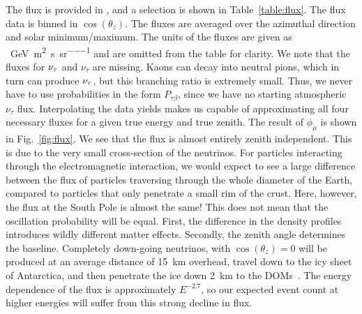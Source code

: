 The flux is provided in \cite{hondaData,hondaArticle}, and a selection is shown in Table~\ref{table:flux}.
The flux data is binned in $\cos(\theta_z)$. The fluxes are averaged over the azimuthal direction and solar minimum/maximum. 
The units of the fluxes are given as \si{\per\GeV \per\metre\squared \per\second \per\steradian} and are omitted
from the table for clarity. 
We note that the fluxes for $\nu_\tau$ and $\nu_{\bar{\tau}}$ are missing. Kaons can decay into neutral pions, which in turn 
can produce $\nu_\tau$, but this branching ratio is extremely small. Thus, we never have to use probabilities in the form 
$P_{\tau \beta}$, since we have no starting atmospheric $\nu_\tau$ flux. 
Interpolating the data yields makes us capable of approximating all four necessary fluxes for a given true energy and true zenith.
The result of $\phi_\mu$ is shown in Fig.~\ref{fig:flux}. We see that the flux is almost entirely zenith independent. This is due to the 
very small cross-section of the neutrinos. For particles interacting through the electromagnetic interaction, we would expect to see a 
large difference between the flux of particles traversing through the whole diameter of the Earth, compared to particles that only penetrate a 
small rim of the crust. Here, however, the flux at the South Pole is almost the same! This does not mean that the oscillation probability will be 
equal. First, the difference in the density profiles introduces wildly different matter effects. 
Secondly, the zenith angle determines the baseline. Completely down-going neutrinos, with $\cos(\theta_z) = 0$ will be produced at an average distance of \SI{15}{\km}
overhead, travel down to the icy sheet of Antarctica, and then penetrate the ice down \SI{2}{\km} to the DOMs~\cite{hondapaper}. 
The energy dependence of the flux is approximately $E^{-2.7}$, so our expected event count at higher energies will suffer from this strong decline in flux.

